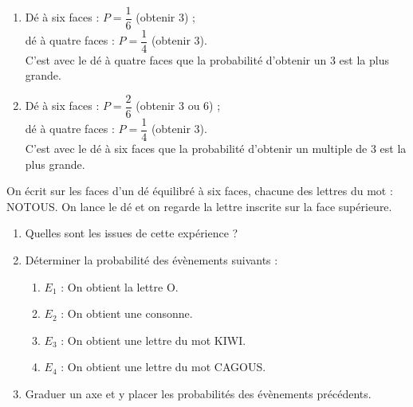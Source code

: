 \begin{colonne*exercice}
\begin{corrige}
   \ \\ [-5mm]
   \begin{enumerate}
      \item Dé à six faces : $P =\dfrac16$ (obtenir 3) ; \\ [1mm]
      dé à quatre faces : $P =\dfrac14$ (obtenir 3). \\ [1mm]
      C'est avec le {\blue dé à quatre faces} que la probabilité d'obtenir un 3 est la plus grande. \smallskip
      \item Dé à six faces : $ P =\dfrac26$ (obtenir 3 ou 6) ; \\ [1mm]
      dé à quatre faces : $P =\dfrac14$ (obtenir 3). \\ [1mm] 
      C'est avec le {\blue dé à six faces} que la probabilité d'obtenir un multiple de 3 est la plus grande.
   \end{enumerate}
\end{corrige}

\bigskip


\begin{exercice} %
   On écrit sur les faces d’un dé équilibré à six faces, chacune des lettres du mot : NOTOUS. On lance le dé et on regarde la lettre inscrite sur la face supérieure.
   \begin{enumerate}
      \item Quelles sont les issues de cette expérience ?
      \item Déterminer la probabilité des évènements suivants :
      \begin{enumerate}
         \item $E_1$ : \og On obtient la lettre O. \fg
         \item $E_2$ : \og On obtient une consonne. \fg
         \item $E_3$ : \og On obtient une lettre du mot KIWI. \fg
         \item $E_4$ : \og On obtient une lettre du mot CAGOUS. \fg
      \end{enumerate}
      \item Graduer un axe et y placer les probabilités des évènements précédents.
   \end{enumerate}
\end{exercice}


\end{colonne*exercice}
